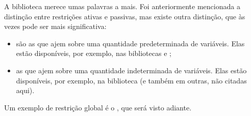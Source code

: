 \documentclass{article}
\begin{document}
A biblioteca  merece umas palavras a mais. Foi anteriormente mencionada a
distinção entre restrições ativas e passivas, mas existe outra distinção, que às vezes pode ser mais
significativa:

\begin{itemize}
  \item {} são as que ajem sobre uma quantidade predeterminada de
    variáveis. Elas estão disponíveis, por exemplo, nas bibliotecas  e
    ;
  \item {} as que ajem sobre uma quantidade indeterminada de variáveis. Elas estão disponíveis, por
    exemplo, na biblioteca  (e também em outras, não citadas aqui).
\end{itemize}

Um exemplo de restrição global é o , que será visto adiante.




\end{document}
